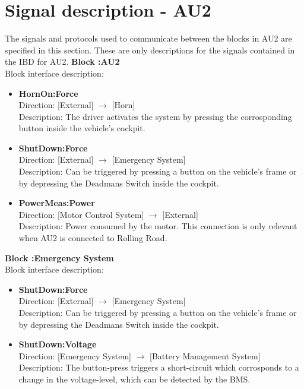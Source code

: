 \section{Signal description - AU2}
The signals and protocols used to communicate between the blocks in AU2 are specified in this section. These are only descriptions for the signals contained in the IBD for AU2.
\textbf{Block :AU2}\\
Block interface description:
\begin{itemize}
	\item \textbf{HornOn:Force}\\
	Direction: [External] $\rightarrow$ [Horn]\\
	Description: The driver activates the system by pressing the corrosponding button inside the vehicle's cockpit.
	\item \textbf{ShutDown:Force}\\
	Direction: [External] $\rightarrow$ [Emergency System]\\
	Description: Can be triggered by pressing a button on the vehicle's frame or by depressing the Deadmans Switch inside the cockpit.
	\item \textbf{PowerMeas:Power}\\
	Direction: [Motor Control System] $\rightarrow$ [External]\\
	Description: Power consumed by the motor. This connection is only relevant when AU2 is connected to Rolling Road.
\end{itemize}

\textbf{Block :Emergency System}\\
Block interface description:
\begin{itemize}
	\item \textbf{ShutDown:Force}\\
	Direction: [External] $\rightarrow$ [Emergency System]\\
	Description: Can be triggered by pressing a button on the vehicle's frame or by depressing the Deadmans Switch inside the cockpit.
	\item \textbf{ShutDown:Voltage}\\
	Direction: [Emergency System] $\rightarrow$ [Battery Management System]\\
	Description: The button-press triggers a short-circuit which corrosponds to a change in the voltage-level, which can be detected by the BMS.
\end{itemize}

